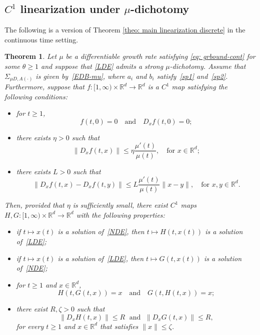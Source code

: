 \documentclass[reqno, a4paper, 10pt]{amsart}
\theoremstyle{plain}
\numberwithin{equation}{section}
\newtheorem{theorem}{Theorem}
\theoremstyle{remark}
\def\R{\mathbb{R}}
\begin{document}
\subsection{$C^1$ linearization under $\mu$-dichotomy} The following is a version of Theorem \ref{theo: main linearization discrete} in the continuous time setting.
\begin{theorem}\label{theo: linarization continuous time pol}
Let $\mu$ be a differentiable growth rate satisfying \eqref{eq: grbound-cont} for some $\theta\geq 1$ and suppose that \eqref{LDE} admits a strong $\mu$-dichotomy. Assume that $\Sigma_{\mu D, A(\cdot)}$ is given by~\eqref{EDB-mu}, where $a_i$ and $b_i$ satisfy~\eqref{sp1} and~\eqref{sp2}.
 Furthermore, suppose that $f\colon [1, \infty)\times \R^d \to \R^d$ is a $C^1$ map satisfying the following conditions:
\begin{itemize}
\item for $t\ge 1$,
\begin{equation}\label{1950}
f(t,0)=0 \quad \text{and} \quad D_x f(t,0)=0;
\end{equation}
\item there exists $\eta >0$ such that 
\begin{equation}\label{1951}
\| D_x f(t,x)\| \le \eta \frac{\mu'(t)}{\mu(t)}, \quad \text{for $x\in \R^d$};
\end{equation}
\item there exists $L>0$ such that 
\begin{equation}\label{1952}
\|D_x f(t,x)-D_x f(t, y)\| \le L\frac{\mu'(t)}{\mu(t)} \|x-y\|, \quad \text{for $x, y\in \R^d$}.
\end{equation}
\end{itemize}
Then, provided that $\eta$ is sufficiently small,  there exist $C^1$ maps $H, G\colon [1, \infty) \times \R^d \to \R^d$ with the following properties:
\begin{itemize}
\item[i)] if $t\mapsto x(t)$ is a solution of~\eqref{NDE}, then $t\mapsto H(t, x(t))$ is a solution of~\eqref{LDE};
\item[ii)] if $t\mapsto x(t)$ is a solution of~\eqref{LDE}, then $t\mapsto G(t, x(t))$ is a solution of~\eqref{NDE};
\item[iii)] for $t\ge 1$ and $x\in \R^d$, 
\[
H(t, G(t,x))=x \quad \text{and} \quad G(t, H(t,x))=x;
\]
\item[iv)] there exist $R, \zeta>0$ such that 
\[
\|D_xH(t,x)\|\leq R \; \text{ and }\; \|D_xG(t,x)\| \leq R , 
\]
for every $t\geq 1$ and $x\in \R^d$ that satisfies $\|x\|\leq \zeta$.
\end{itemize}
\end{theorem}
\end{document}
